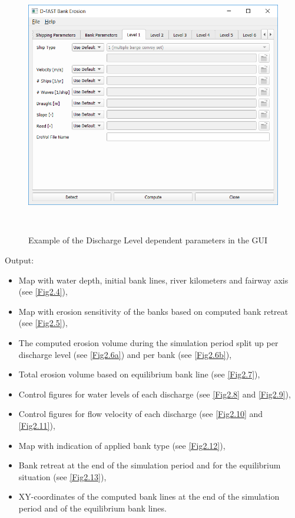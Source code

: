 \clearpage
\begin{figure}[!ht]
\vspace{-0.75cm} 
\center
\includegraphics[width=\textwidth,height=11.4cm]{figures/gui6.png}
\caption{Example of the Discharge Level dependent parameters in the GUI}
\label{guiLevelX}
\vspace{-0.15cm} 
\end{figure}

Output:

\begin{itemize}
	\item Map with water depth, initial bank lines, river kilometers and fairway axis (see \autoref{Fig2.4}),
	\item Map with erosion sensitivity of the banks based on computed bank retreat (see \autoref{Fig2.5}),
	\item The computed erosion volume during the simulation period split up per discharge level (see \autoref{Fig2.6a}) and per bank (see \autoref{Fig2.6b}),
	\item Total erosion volume based on equilibrium bank line (see \autoref{Fig2.7}),
	\item Control figures for water levels of each discharge (see \autoref{Fig2.8} and \autoref{Fig2.9}),
	\item Control figures for flow velocity of each discharge (see \autoref{Fig2.10} and \autoref{Fig2.11}),
	\item Map with indication of applied bank type (see \autoref{Fig2.12}),
	\item Bank retreat at the end of the simulation period and for the equilibrium situation (see \autoref{Fig2.13}),
	\item XY-coordinates of the computed bank lines at the end of the simulation period and of the equilibrium bank lines.
\end{itemize}

